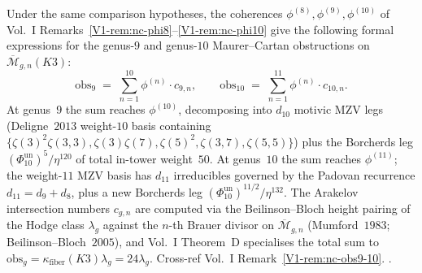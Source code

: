 \begin{remark}
\label{rem:cdhg-obs-9-10}
Under the same comparison hypotheses, the coherences
$\phi^{(8)}, \phi^{(9)}, \phi^{(10)}$ of Vol.~I
Remarks~\ref{V1-rem:nc-phi8}--\ref{V1-rem:nc-phi10}
give the following formal expressions for the genus-$9$ and genus-$10$
Maurer--Cartan obstructions on
$\overline{\mathcal M}_{g,n}(K3)$:
\[
\mathrm{obs}_{9} \;=\; \sum_{n=1}^{10}\phi^{(n)}\cdot c_{9,n},
\qquad
\mathrm{obs}_{10} \;=\; \sum_{n=1}^{11}\phi^{(n)}\cdot c_{10,n}.
\]
At genus~$9$ the sum reaches $\phi^{(10)}$, decomposing into
$d_{10}$ motivic MZV legs (Deligne~$2013$ weight-$10$ basis containing
$\{\zeta(3)^2\zeta(3,3),\zeta(3)\zeta(7),\zeta(5)^2,\zeta(3,7),\zeta(5,5)\}$)
plus the Borcherds leg
$(\Phi_{10}^{\mathrm{un}})^{5}/\eta^{120}$ of total in-tower
weight~$50$. At genus~$10$ the sum reaches $\phi^{(11)}$; the
weight-$11$ MZV basis has $d_{11}$ irreducibles governed by
the Padovan recurrence $d_{11} = d_9 + d_8$, plus a new
Borcherds leg
$(\Phi_{10}^{\mathrm{un}})^{11/2}/\eta^{132}$. The Arakelov
intersection numbers $c_{g,n}$ are computed via the
Beilinson--Bloch height pairing of the Hodge class $\lambda_g$
against the $n$-th Brauer divisor on $\overline{\mathcal M}_{g,n}$
(Mumford~$1983$; Beilinson--Bloch~$2005$), and Vol.~I Theorem~D
specialises the total sum to
$\mathrm{obs}_g = \kappa_{\mathrm{fiber}}(K3)\lambda_g = 24\lambda_g$.
Cross-ref Vol.~I Remark~\ref{V1-rem:nc-obs9-10}.
\cite{Mumford1983,BeilinsonBloch2005,Brown2011,Deligne2013,
 GritsenkoNikulin1998}.
\end{remark}

